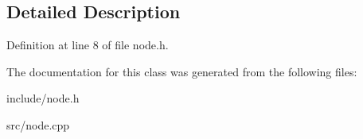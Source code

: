 \subsection{Detailed Description}


Definition at line 8 of file node.\+h.



The documentation for this class was generated from the following files\+:\begin{DoxyCompactItemize}
\item 
include/node.\+h\item 
src/node.\+cpp\end{DoxyCompactItemize}
